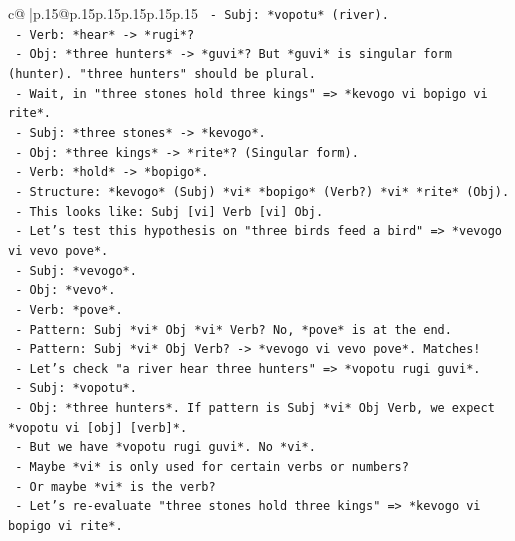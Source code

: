\documentclass{article}
\begin{document}
{\begin{supertabular}{c@{$\;$}|p{.15\linewidth}@{}p{.15\linewidth}p{.15\linewidth}p{.15\linewidth}p{.15\linewidth}p{.15\linewidth}}
{{{\texttt{               {-} Subj: *vopotu* (river).} \\
\texttt{               {-} Verb: *hear* {-}> *rugi*?} \\
\texttt{               {-} Obj: *three hunters* {-}> *guvi*? But *guvi* is singular form (hunter). "three hunters" should be plural.} \\
\texttt{               {-} Wait, in "three stones hold three kings" => *kevogo vi bopigo vi rite*.} \\
\texttt{                 {-} Subj: *three stones* {-}> *kevogo*.} \\
\texttt{                 {-} Obj: *three kings* {-}> *rite*? (Singular form).} \\
\texttt{                 {-} Verb: *hold* {-}> *bopigo*.} \\
\texttt{                 {-} Structure: *kevogo* (Subj) *vi* *bopigo* (Verb?) *vi* *rite* (Obj).} \\
\texttt{                 {-} This looks like: Subj {[}vi{]} Verb {[}vi{]} Obj.} \\
\texttt{                 {-} Let's test this hypothesis on "three birds feed a bird" => *vevogo vi vevo pove*.} \\
\texttt{                   {-} Subj: *vevogo*.} \\
\texttt{                   {-} Obj: *vevo*.} \\
\texttt{                   {-} Verb: *pove*.} \\
\texttt{                   {-} Pattern: Subj *vi* Obj *vi* Verb? No, *pove* is at the end.} \\
\texttt{                   {-} Pattern: Subj *vi* Obj Verb? {-}> *vevogo vi vevo pove*. Matches!} \\
\texttt{                   {-} Let's check "a river hear three hunters" => *vopotu rugi guvi*.} \\
\texttt{                     {-} Subj: *vopotu*.} \\
\texttt{                     {-} Obj: *three hunters*. If pattern is Subj *vi* Obj Verb, we expect *vopotu vi {[}obj{]} {[}verb{]}*.} \\
\texttt{                     {-} But we have *vopotu rugi guvi*. No *vi*.} \\
\texttt{                     {-} Maybe *vi* is only used for certain verbs or numbers?} \\
\texttt{                     {-} Or maybe *vi* is the verb?} \\
\texttt{                     {-} Let's re{-}evaluate "three stones hold three kings" => *kevogo vi bopigo vi rite*.} \\
}}}
\end{supertabular}}
\end{document}
